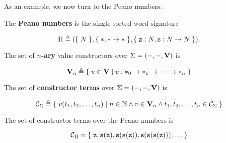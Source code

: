 
As an example, we now turn to the Peano numbers:

\begin{definition} The \textbf{Peano numbers} is the single-sorted word
signature

$$\Pi \triangleq \p{\set{N}, \set{*, * \rightarrow *}, \set{\mathtt{z} : N,
\mathtt{s} : N \rightarrow N}}.$$

\end{definition}



\begin{definition} The set of \textbf{$n$-ary} value constructors over $\Sigma
= \p{-, -, \mathbf{V}}$ is

$$\mathbf{V}_n \triangleq \set{v \in \mathbf{V} \st{v : *_0 \rightarrow *_1
\rightarrow \cdots \rightarrow *_n}}$$

\end{definition}

\begin{definition} The set of \textbf{constructor terms} over
$\Sigma=\p{-, -, \mathbf{V}}$ is

$$\mathcal{C}_\Sigma \triangleq \set{v\p{t_1,t_2,\ldots,t_n} \st{n \in
\mathbb{N} \wedge v \in \mathbf{V}_n \wedge t_1,t_2,\ldots,t_n \in
\mathcal{C}_\Sigma}}$$

\end{definition}

\begin{example} The set of constructor terms over the Peano numbers is

$$\mathcal{C}_\Pi = \set{\mathtt{z}, \mathtt{s}\p{\mathtt{z}},
\mathtt{s}\p{\mathtt{s}\p{\mathtt{z}}},
\mathtt{s}\p{\mathtt{s}\p{\mathtt{s}\p{\mathtt{z}}}}, \ldots}$$

\end{example}

